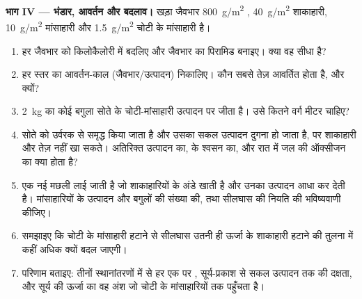 \begin{problem}
\medskip
\noindent\textbf{भाग IV --- भंडार, आवर्तन और बदलाव।}
खड़ा जैवभार \qty{800}{g/m^2} , \qty{40}{g/m^2}
शाकाहारी, \qty{10}{g/m^2} मांसाहारी और \qty{1.5}{g/m^2} चोटी के
मांसाहारी है।
\begin{enumerate}[resume]
  \item हर जैवभार को किलोकैलोरी में बदलिए और जैवभार का पिरामिड बनाइए।
        क्या वह सीधा है?
  \item हर स्तर का आवर्तन-काल (जैवभार/उत्पादन) निकालिए। कौन सबसे तेज़
        आवर्तित होता है, और क्यों?
  \item \qty{2}{kg} का कोई बगुला सोते के चोटी-मांसाहारी उत्पादन पर
        जीता है। उसे कितने वर्ग मीटर चाहिए?
  \item सोते को उर्वरक से समृद्ध किया जाता है और उसका सकल उत्पादन दुगना
        हो जाता है, पर शाकाहारी और तेज़ नहीं खा सकते। अतिरिक्त उत्पादन
        का,  के श्वसन का, और रात में जल की ऑक्सीजन का क्या होता
        है?
  \item एक नई मछली लाई जाती है जो शाकाहारियों के अंडे खाती है और उनका
        उत्पादन आधा कर देती है। मांसाहारियों के उत्पादन और बगुलों की
        संख्या की, तथा सीलघास की नियति की भविष्यवाणी कीजिए।
  \item समझाइए कि चोटी के मांसाहारी हटाने से सीलघास उतनी ही ऊर्जा के
        शाकाहारी हटाने की तुलना में कहीं अधिक क्यों बदल जाएगी।
  \item परिणाम बताइए: तीनों स्थानांतरणों में से हर एक पर ,
        सूर्य-प्रकाश से सकल उत्पादन तक की दक्षता, और सूर्य की ऊर्जा का
        वह अंश जो चोटी के मांसाहारियों तक पहुँचता है।
\end{enumerate}
\end{problem}
